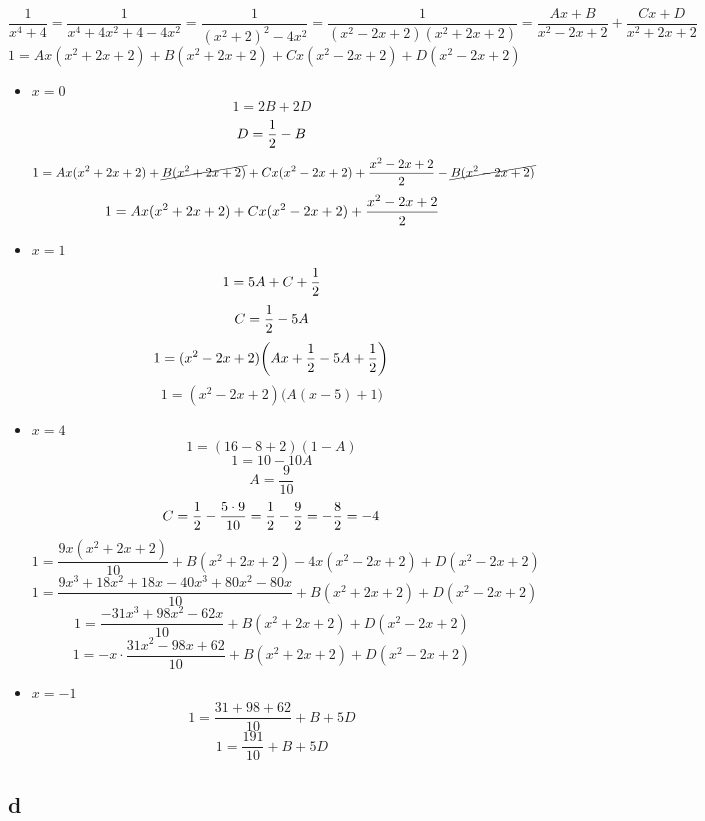 $$ \frac1{x^4 + 4} = \frac1{x^4 + 4x^2 + 4 - 4x^2} = \frac1{(x^2 + 2)^2 - 4x^2} = \frac1{(x^2 - 2x + 2)(x^2 + 2x + 2)} = \frac{Ax + B}{x^2 - 2x + 2} + \frac{Cx + D}{x^2 + 2x + 2} $$
$$ 1 = Ax(x^2 + 2x + 2) + B(x^2 + 2x + 2) + Cx(x^2 - 2x + 2) + D(x^2 - 2x + 2) $$
\begin{itemize}
	\item $ x = 0 $
    $$ 1 = 2B + 2D $$
    $$ D = \half - B $$
    $$ 1 = Ax(x^2 + 2x + 2) + \cancel{B(x^2 + 2x + 2)} + Cx(x^2 - 2x + 2) + \half[x^2 - 2x + 2] - \cancel{B(x^2 -2x + 2)} $$
    $$ 1 = Ax(x^2 + 2x + 2) + Cx(x^2 - 2x + 2) + \half[x^2 - 2x + 2] $$
    \item $ x = 1 $
    $$ 1 = 5A + C + \half $$
    $$ C = \half - 5A $$
    $$ 1 = (x^2 - 2x + 2) \bigg( Ax + \half - 5A + \half \bigg) $$
    $$ 1 = (x^2 - 2x + 2) \bigg( A(x - 5) + 1 \bigg) $$
    \item $ x = 4 $
    $$ 1 = (16 - 8 + 2)(1 - A) $$
    $$ 1 = 10 - 10A $$
    $$ A = \frac9{10} $$
    $$ C = \half - \frac{5 \cdot 9}{10} = \half - \half[9] = -\half[8] = -4 $$
    $$ 1 = \frac{9x(x^2 + 2x + 2)}{10} + B(x^2 + 2x + 2) - 4x(x^2 - 2x + 2) + D(x^2 - 2x + 2) $$
    $$ 1 = \frac{9x^3 + 18x^2 + 18x - 40x^3 + 80x^2 - 80x}{10} + B(x^2 + 2x + 2) + D(x^2 - 2x + 2) $$
    $$ 1 = \frac{-31x^3 + 98x^2 - 62x}{10} + B(x^2 + 2x + 2) + D(x^2 - 2x + 2) $$
    $$ 1 = -x \cdot \frac{31x^2 - 98x + 62}{10} + B(x^2 + 2x + 2) + D(x^2 - 2x + 2) $$
    \item $ x = -1 $
    $$ 1 = \frac{31 + 98 + 62}{10} + B + 5D $$
    $$ 1 = \frac{191}{10} + B + 5D $$
\end{itemize}

\subsection{d}

